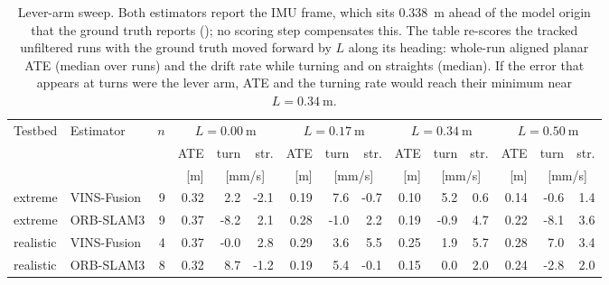 \begin{table}[htbp]
\centering
\scriptsize
\setlength{\tabcolsep}{3pt}
\caption[Lever-arm sweep: ATE and turning drift against the assumed IMU offset.]{Lever-arm sweep. Both estimators report the IMU frame, which sits \SI{0.338}{\metre} ahead of the model origin that the ground truth reports (); no scoring step compensates this. The table re-scores the tracked unfiltered runs with the ground truth moved forward by $L$ along its heading: whole-run aligned planar ATE (median over runs) and the drift rate while turning and on straights (median). If the error that appears at turns were the lever arm, ATE and the turning rate would reach their minimum near $L = \SI{0.34}{\metre}$.}
\label{tab:insight-lever}
\begin{tabular}{llrrrrrrrrrrrrr}
\toprule
Testbed & Estimator & $n$ & \multicolumn{3}{c}{$L=\SI{0.00}{\metre}$} & \multicolumn{3}{c}{$L=\SI{0.17}{\metre}$} & \multicolumn{3}{c}{$L=\SI{0.34}{\metre}$} & \multicolumn{3}{c}{$L=\SI{0.50}{\metre}$} \\
 & & & ATE & turn & str. & ATE & turn & str. & ATE & turn & str. & ATE & turn & str. \\
 & & & [m] & \multicolumn{2}{c}{[mm/s]} & [m] & \multicolumn{2}{c}{[mm/s]} & [m] & \multicolumn{2}{c}{[mm/s]} & [m] & \multicolumn{2}{c}{[mm/s]} \\
\midrule
extreme & VINS-Fusion & 9 & 0.32 & 2.2 & -2.1 & 0.19 & 7.6 & -0.7 & 0.10 & 5.2 & 0.6 & 0.14 & -0.6 & 1.4 \\
extreme & ORB-SLAM3 & 9 & 0.37 & -8.2 & 2.1 & 0.28 & -1.0 & 2.2 & 0.19 & -0.9 & 4.7 & 0.22 & -8.1 & 3.6 \\
realistic & VINS-Fusion & 4 & 0.37 & -0.0 & 2.8 & 0.29 & 3.6 & 5.5 & 0.25 & 1.9 & 5.7 & 0.28 & 7.0 & 3.4 \\
realistic & ORB-SLAM3 & 8 & 0.32 & 8.7 & -1.2 & 0.19 & 5.4 & -0.1 & 0.15 & 0.0 & 2.0 & 0.24 & -2.8 & 2.0 \\
\bottomrule
\end{tabular}
\end{table}
